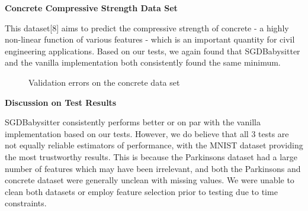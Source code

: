 \documentclass{article}
\begin{document}
\textbf{Concrete Compressive Strength Data Set}
\par This dataset[8] aims to predict the compressive strength of concrete -  a highly non-linear function of various features - which is an important quantity for civil engineering applications. Based on our tests, we again found that SGDBabysitter and the vanilla implementation both consistently found the same minimum. 
\begin{figure}[H]
	\centering
	\quad
	\caption{Validation errors on the concrete data set}%
	\label{Concrete}%
\end{figure}

\textbf{Discussion on Test Results}
\par SGDBabysitter consistently performs better or on par with the vanilla implementation based on our tests. However, we do believe that all $ 3 $ tests are not equally reliable estimators of performance, with the MNIST dataset providing the most trustworthy results. This is because the Parkinsons dataset had a large number of features which may have been irrelevant, and both the Parkinsons and concrete dataset were generally unclean with missing values. We were unable to clean both datasets or employ feature selection prior to testing due to time constraints. 
\end{document}
